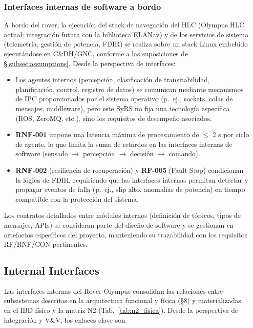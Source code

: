 \subsubsection{Interfaces internas de software a bordo}

A bordo del rover, la ejecución del stack de navegación del HLC (Olympus HLC actual; integración futura con la biblioteca ELANav) y de los servicios de sistema (telemetría, gestión de potencia, FDIR) se realiza sobre un stack Linux embebido ejecutándose en C\&DH/GNC, conforme a las suposiciones de \S\ref{subsec:assumptions}. Desde la perspectiva de interfaces:

\begin{itemize}
    \item Los agentes internos (percepción, clasificación de transitabilidad, planificación, control, registro de datos) se comunican mediante mecanismos de IPC proporcionados por el sistema operativo (p.\ ej., sockets, colas de mensajes, middleware), pero este SyRS no fija una tecnología específica (ROS, ZeroMQ, etc.), sino los requisitos de desempeño asociados.
    \item \textbf{RNF‑001} impone una latencia máxima de procesamiento de $\le$ 2 s por ciclo de agente, lo que limita la suma de retardos en las interfaces internas de software (sensado $\rightarrow$ percepción $\rightarrow$ decisión $\rightarrow$ comando).
    \item \textbf{RNF‑002} (resiliencia de recuperación) y \textbf{RF‑005} (Fault Stop) condicionan la lógica de FDIR, requiriendo que las interfaces internas permitan detectar y propagar eventos de falla (p.\ ej., slip alto, anomalías de potencia) en tiempo compatible con la protección del sistema.
\end{itemize}

Los contratos detallados entre módulos internos (definición de tópicos, tipos de mensajes, APIs) se consideran parte del diseño de software y se gestionan en artefactos específicos del proyecto, manteniendo su trazabilidad con los requisitos RF/RNF/CON pertinentes.

\subsection{Internal Interfaces}\label{subsec:internal_interfaces}

Las interfaces internas del Rover Olympus consolidan las relaciones entre subsistemas descritas en la arquitectura funcional y física (§8) y materializadas en el IBD físico y la matriz N2 (Tab.~\ref{tab:n2_fisica}). Desde la perspectiva de integración y V\&V, los enlaces clave son:

